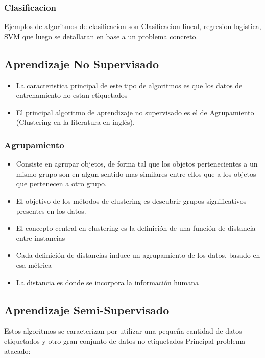 \documentclass[a4paper,11pt,spanish]{book}
\begin{document}
      \subsubsection{Clasificacion}

      Ejemplos de algoritmos de clasificacion son Clasificacion lineal, regresion logistica, SVM que luego se detallaran en base a un problema concreto.
  
    \subsection{Aprendizaje No Supervisado} 
      \begin{itemize}
	\item La caracteristica principal de este tipo de algoritmos es que los datos de entrenamiento no estan etiquetados
	\item El principal algoritmo de aprendizaje no supervisado es el de Agrupamiento (Clustering en la literatura en inglés).
      \end{itemize}
      \subsubsection {Agrupamiento}
	\begin{itemize}
	  \item Consiste en agrupar objetos, de forma tal que los objetos pertenecientes a un mismo grupo son en algun sentido mas similares entre ellos que a los objetos que pertenecen a otro grupo.
	  \item El objetivo de los métodos de clustering es descubrir grupos significativos presentes en los datos.
	  \item El concepto central en clustering es la definición de una función de distancia entre instancias
	  \item Cada definición de distancias induce un agrupamiento de los datos, basado en esa métrica
	  \item La distancia es donde se incorpora la información humana
	\end{itemize}

    \subsection{Aprendizaje Semi-Supervisado}

      Estos algoritmos se caracterizan por utilizar una pequeña cantidad de datos etiquetados y otro gran conjunto de datos no etiquetados
      Principal problema atacado:
\end{document}
